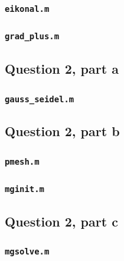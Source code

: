 \documentclass[10pt]{article}
\begin{document}
\subsubsection{{\tt eikonal.m}}

\subsubsection{{\tt grad\_plus.m}}

\subsection{Question 2, part a}
\subsubsection{{\tt gauss\_seidel.m}}

\subsection{Question 2, part b}
\subsubsection{{\tt pmesh.m}}

\subsubsection{{\tt mginit.m}}

\subsection{Question 2, part c}
\subsubsection{{\tt mgsolve.m}}

\end{document}
